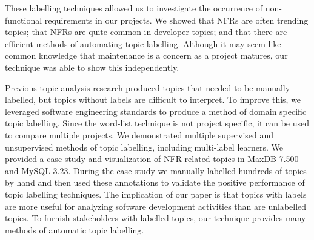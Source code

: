 \documentclass[]{sig-alternate}
\begin{document}
These labelling techniques allowed us to investigate the occurrence of non-functional requirements in our projects.
We showed that NFRs are often trending topics; that NFRs are quite common in developer topics; and that there are efficient methods of automating topic labelling.
Although it may seem like common knowledge that maintenance is a concern as a project matures, our technique was able to show this independently.





Previous topic analysis research produced topics that needed to be manually labelled, but topics without labels are difficult to interpret.
To improve this, we leveraged software engineering standards to produce a method of domain specific topic labelling.
Since the word-list technique is not project specific, it can be used to compare multiple projects.
We demonstrated multiple supervised and unsupervised methods of topic labelling, including multi-label learners.
We provided a case study and visualization of NFR related topics in MaxDB 7.500 and MySQL 3.23. 
During the case study we manually labelled hundreds of topics by hand and then used these annotations to validate the positive performance of topic labelling techniques.
The implication of our paper is that topics with labels are more useful for analyzing software development activities than are unlabelled topics. To furnish stakeholders with labelled topics, our technique provides many methods of automatic topic labelling.

 
\end{document}
